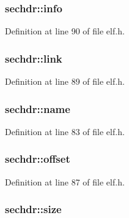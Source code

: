 \hypertarget{structsechdr_ab42c2f90e8a62f87567a1b75836dcaa2}{
\subsubsection[{info}]{ {\bf sechdr\-::info}}}\label{structsechdr_ab42c2f90e8a62f87567a1b75836dcaa2}


\-Definition at line 90 of file elf.\-h.

\hypertarget{structsechdr_a23b277d435b5937eaad56740aa53a569}{
\subsubsection[{link}]{ {\bf sechdr\-::link}}}\label{structsechdr_a23b277d435b5937eaad56740aa53a569}


\-Definition at line 89 of file elf.\-h.

\hypertarget{structsechdr_a45bd257777c9fc7d036b6854755d8790}{
\subsubsection[{name}]{ {\bf sechdr\-::name}}}\label{structsechdr_a45bd257777c9fc7d036b6854755d8790}


\-Definition at line 83 of file elf.\-h.

\hypertarget{structsechdr_aaae33ec54a7d3cb7e6c8138c4a716474}{
\subsubsection[{offset}]{ {\bf sechdr\-::offset}}}\label{structsechdr_aaae33ec54a7d3cb7e6c8138c4a716474}


\-Definition at line 87 of file elf.\-h.

\hypertarget{structsechdr_a309283bfb10685dfd97616963648fb96}{
\subsubsection[{size}]{ {\bf sechdr\-::size}}}\label{structsechdr_a309283bfb10685dfd97616963648fb96}


